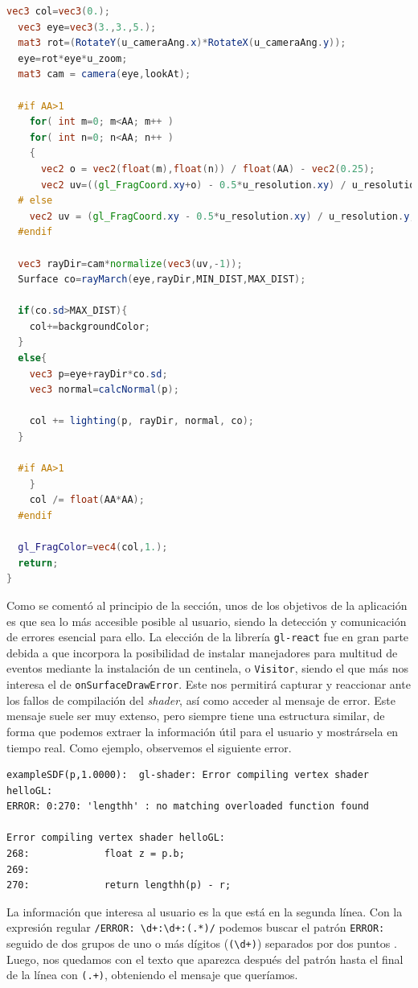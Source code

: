 \begin{lstlisting}[language=GLSL, caption=Procesador de fragmentos]
  vec3 col=vec3(0.);
  vec3 eye=vec3(3.,3.,5.);
  mat3 rot=(RotateY(u_cameraAng.x)*RotateX(u_cameraAng.y));
  eye=rot*eye*u_zoom;
  mat3 cam = camera(eye,lookAt);

  #if AA>1
    for( int m=0; m<AA; m++ )
    for( int n=0; n<AA; n++ )
    {
      vec2 o = vec2(float(m),float(n)) / float(AA) - vec2(0.25);
      vec2 uv=((gl_FragCoord.xy+o) - 0.5*u_resolution.xy) / u_resolution.y;
  # else
    vec2 uv = (gl_FragCoord.xy - 0.5*u_resolution.xy) / u_resolution.y;
  #endif
  
  vec3 rayDir=cam*normalize(vec3(uv,-1));
  Surface co=rayMarch(eye,rayDir,MIN_DIST,MAX_DIST);
  
  if(co.sd>MAX_DIST){
    col+=backgroundColor;
  }
  else{
    vec3 p=eye+rayDir*co.sd;
    vec3 normal=calcNormal(p);
    
    col += lighting(p, rayDir, normal, co);
  }
  
  #if AA>1
    }
    col /= float(AA*AA);
  #endif
  
  gl_FragColor=vec4(col,1.);
  return;
}
\end{lstlisting}


Como se comentó al principio de la sección, unos de los objetivos de la aplicación es que sea lo más accesible posible al usuario, siendo la detección y comunicación de errores esencial para ello. La elección de la librería \texttt{gl-react} fue en gran parte debida a que incorpora la posibilidad de instalar manejadores para multitud de eventos mediante la instalación de un centinela, o \texttt{Visitor}, siendo el que más nos interesa el de \texttt{onSurfaceDrawError}. Este nos permitirá  capturar y reaccionar ante los fallos de compilación del \textit{shader}, así como acceder al mensaje de error. Este mensaje suele ser muy extenso, pero siempre tiene una estructura similar, de forma que podemos extraer la información útil para el usuario y mostrársela en tiempo real. Como ejemplo, observemos el siguiente error.
\begin{lstlisting}
exampleSDF(p,1.0000):  gl-shader: Error compiling vertex shader helloGL:
ERROR: 0:270: 'lengthh' : no matching overloaded function found

Error compiling vertex shader helloGL:
268:             float z = p.b;
269:       
270:             return lengthh(p) - r;
\end{lstlisting}
La información que interesa al usuario es la que está en la segunda línea. Con la expresión regular \texttt{/ERROR: \textbackslash d+:\textbackslash d+:(.*)/} podemos buscar el patrón \texttt{ERROR:} seguido de dos grupos de uno o más dígitos (\texttt{(\textbackslash d+)}) separados por dos puntos . Luego, nos quedamos con el texto que aparezca después del patrón hasta el final de la línea con \texttt{(.+)}, obteniendo el mensaje que queríamos.\newline

